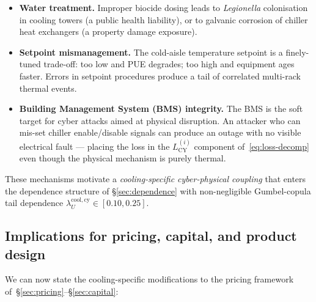 \begin{itemize}[leftmargin=*,nosep,topsep=4pt]
   \item \textbf{Water treatment.} Improper biocide dosing leads to
         \emph{Legionella} colonisation in cooling towers (a public
         health liability), or to galvanic corrosion of chiller
         heat exchangers (a property damage exposure).
   \item \textbf{Setpoint mismanagement.} The cold-aisle temperature
         setpoint is a finely-tuned trade-off: too low and PUE
         degrades; too high and equipment ages faster. Errors in
         setpoint procedures produce a tail of correlated
         multi-rack thermal events.
   \item \textbf{Building Management System (BMS) integrity.} The BMS
         is the soft target for cyber attacks aimed at physical
         disruption. An attacker who can mis-set chiller
         enable/disable signals can produce an outage with no
         visible electrical fault --- placing the loss in the
         $L^{(i)}_{\mathrm{CY}}$ component of~\eqref{eq:loss-decomp}
         even though the physical mechanism is purely thermal.
\end{itemize}

These mechanisms motivate a \emph{cooling-specific cyber-physical
coupling} that enters the dependence structure of
\S\ref{sec:dependence} with non-negligible Gumbel-copula tail
dependence $\lambda_U^{\mathrm{cool,cy}}\in[0.10,0.25]$.

\subsection{Implications for pricing, capital, and product design}\label{ss:cool-pricing}

We can now state the cooling-specific modifications to the
pricing framework of~\S\ref{sec:pricing}--\S\ref{sec:capital}:

